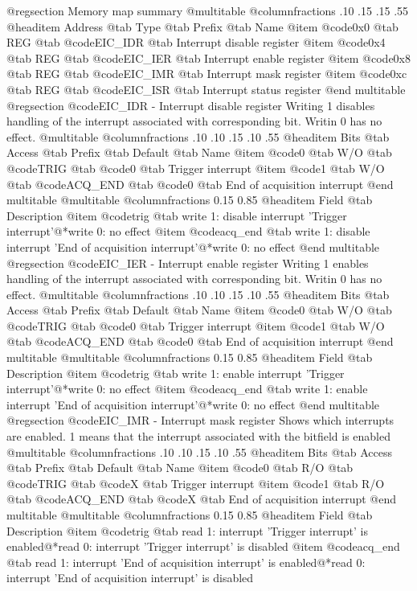 @regsection Memory map summary
@multitable  @columnfractions .10 .15 .15 .55
@headitem Address @tab Type @tab Prefix @tab Name
@item @code{0x0} @tab
REG @tab
@code{EIC_IDR} @tab
Interrupt disable register
@item @code{0x4} @tab
REG @tab
@code{EIC_IER} @tab
Interrupt enable register
@item @code{0x8} @tab
REG @tab
@code{EIC_IMR} @tab
Interrupt mask register
@item @code{0xc} @tab
REG @tab
@code{EIC_ISR} @tab
Interrupt status register
@end multitable 
@regsection @code{EIC_IDR} - Interrupt disable register
Writing 1 disables handling of the interrupt associated with corresponding bit. Writin 0 has no effect.
@multitable @columnfractions .10 .10 .15 .10 .55
@headitem Bits @tab Access @tab Prefix @tab Default @tab Name
@item @code{0}
@tab W/O @tab
@code{TRIG}
@tab @code{0} @tab 
Trigger interrupt
@item @code{1}
@tab W/O @tab
@code{ACQ_END}
@tab @code{0} @tab 
End of acquisition interrupt
@end multitable
@multitable @columnfractions 0.15 0.85
@headitem Field @tab Description
@item @code{trig} @tab write 1: disable interrupt 'Trigger interrupt'@*write 0: no effect
@item @code{acq_end} @tab write 1: disable interrupt 'End of acquisition interrupt'@*write 0: no effect
@end multitable
@regsection @code{EIC_IER} - Interrupt enable register
Writing 1 enables handling of the interrupt associated with corresponding bit. Writin 0 has no effect.
@multitable @columnfractions .10 .10 .15 .10 .55
@headitem Bits @tab Access @tab Prefix @tab Default @tab Name
@item @code{0}
@tab W/O @tab
@code{TRIG}
@tab @code{0} @tab 
Trigger interrupt
@item @code{1}
@tab W/O @tab
@code{ACQ_END}
@tab @code{0} @tab 
End of acquisition interrupt
@end multitable
@multitable @columnfractions 0.15 0.85
@headitem Field @tab Description
@item @code{trig} @tab write 1: enable interrupt 'Trigger interrupt'@*write 0: no effect
@item @code{acq_end} @tab write 1: enable interrupt 'End of acquisition interrupt'@*write 0: no effect
@end multitable
@regsection @code{EIC_IMR} - Interrupt mask register
Shows which interrupts are enabled. 1 means that the interrupt associated with the bitfield is enabled
@multitable @columnfractions .10 .10 .15 .10 .55
@headitem Bits @tab Access @tab Prefix @tab Default @tab Name
@item @code{0}
@tab R/O @tab
@code{TRIG}
@tab @code{X} @tab 
Trigger interrupt
@item @code{1}
@tab R/O @tab
@code{ACQ_END}
@tab @code{X} @tab 
End of acquisition interrupt
@end multitable
@multitable @columnfractions 0.15 0.85
@headitem Field @tab Description
@item @code{trig} @tab read 1: interrupt 'Trigger interrupt' is enabled@*read 0: interrupt 'Trigger interrupt' is disabled
@item @code{acq_end} @tab read 1: interrupt 'End of acquisition interrupt' is enabled@*read 0: interrupt 'End of acquisition interrupt' is disabled
